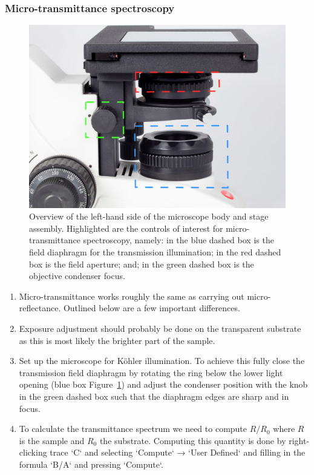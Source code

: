 \documentclass[a4paper]{scrartcl}
\begin{document}
\subsubsection*{Micro-transmittance spectroscopy}
\begin{figure}[h]
\begin{center}
	\includegraphics[width=0.5\linewidth, keepaspectratio]{figures/kohler.png}
\end{center}
\caption{Overview of the left-hand side of the microscope body and stage assembly. Highlighted are the controls of interest for micro-transmittance spectroscopy, namely: in the blue dashed box is the field diaphragm for the transmission illumination; in the red dashed box is the field aperture; and; in the green dashed box is the objective condenser focus.}
\label{fig:kohler}
\end{figure}

\begin{enumerate}
	\item Micro-transmittance works roughly the same as carrying out micro-reflectance. Outlined below are a few important differences.
	\item Exposure adjustment should probably be done on the transparent substrate as this is most likely the brighter part of the sample.
	\item Set up the microscope for Köhler illumination. To achieve this fully close the transmission field diaphragm by rotating the ring below the lower light opening (blue box Figure~\ref{fig:kohler}) and adjust the condenser position with the knob in the green dashed box such that the diaphragm edges are sharp and in focus.
	\item To calculate the transmittance spectrum we need to compute $R/R_0$ where $R$ is the sample and $R_0$ the substrate. Computing this quantity is done by right-clicking trace `C` and selecting `Compute` → `User Defined` and filling in the formula `B/A` and pressing `Compute`.
\end{enumerate}
\end{document}
